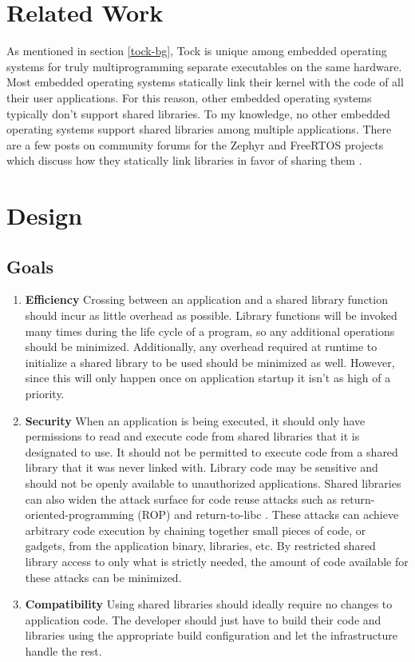 \documentclass[12pt]{ucsddissertation}
\begin{document}
\chapter{Related Work}
As mentioned in section \ref{tock-bg}, Tock is unique among embedded operating systems for truly multiprogramming separate executables on the same hardware. Most embedded operating systems statically link their kernel with the code of all their user applications. For this reason, other embedded operating systems typically don't support shared libraries. To my knowledge, no other embedded operating systems support shared libraries among multiple applications. There are a few posts on community forums for the Zephyr and FreeRTOS projects which discuss how they statically link libraries in favor of sharing them \cite{zephyr-shlib, freertos-shlib}.

\chapter{Design} \label{design}

\section{Goals}
\begin{enumerate}
    \item \textbf{Efficiency} Crossing between an application and a shared library function should incur as little overhead as possible. Library functions will be invoked many times during the life cycle of a program, so any additional operations should be minimized. Additionally, any overhead required at runtime to initialize a shared library to be used should be minimized as well. However, since this will only happen once on application startup it isn't as high of a priority.

    \item \textbf{Security} When an application is being executed, it should only have permissions to read and execute code from shared libraries that it is designated to use. It should not be permitted to execute code from a shared library that it was never linked with. Library code may be sensitive and should not be openly available to unauthorized applications. Shared libraries can also widen the attack surface for code reuse attacks such as return-oriented-programming (ROP) and return-to-libc \cite{libsec}. These attacks can achieve arbitrary code execution by chaining together small pieces of code, or gadgets, from the application binary, libraries, etc. By restricted shared library access to only what is strictly needed, the amount of code available for these attacks can be minimized.
    \item \textbf{Compatibility} Using shared libraries should ideally require no changes to application code. The developer should just have to build their code and libraries using the appropriate build configuration and let the infrastructure handle the rest.
\end{enumerate}
\end{document}
